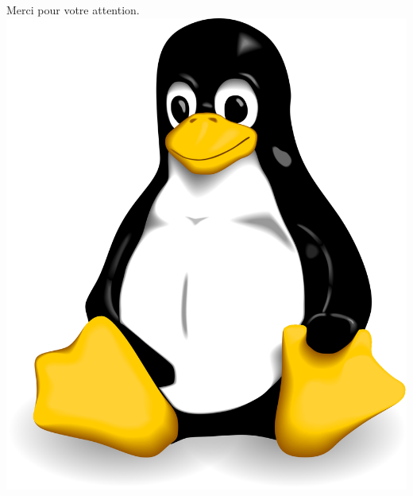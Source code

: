 \documentclass{beamer}
\begin{document}
	\begin{frame}
		\begin{center}
			\huge{Merci pour votre attention.} \\
			\includegraphics[scale=0.32]{images/tux.png}
		\end{center}
	\end{frame}
\end{document}
